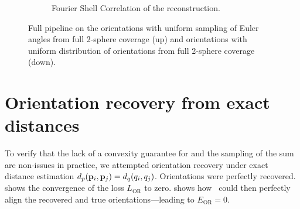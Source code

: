 \begin{figure}[ht!]
\begin{subfigure}[b]{0.4\linewidth}
        \caption{Fourier Shell Correlation of the reconstruction.}
    \end{subfigure}
    \caption{%
        Full pipeline on the orientations with uniform sampling of Euler angles from full 2-sphere coverage (up) and orientations with uniform distribution of orientations from full 2-sphere coverage (down).
        }\label{fig:uniform-angles-vs-rotations}
\end{figure}

\section{Orientation recovery from exact distances}\label{apx:results:orientation-recovery:exact}


To verify that the lack of a convexity guarantee for  and the sampling of the sum are non-issues in practice, we attempted orientation recovery under exact distance estimation $d_p(\mathbf{p}_i, \mathbf{p}_j) = d_q(q_i, q_j)$.
Orientations were perfectly recovered.
 shows the convergence of the loss $L_\text{OR}$ to zero.
 shows how~ could then perfectly align the recovered and true orientations---leading to $E_\text{OR} = 0$.

